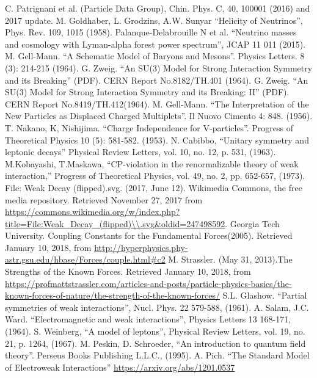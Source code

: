 \documentclass[print]{nuthesis}
\begin{document}
\begin{thebibliography}{300}
 C. Patrignani et al. (Particle Data Group), Chin. Phys. C, 40, 100001 (2016) and 2017 update.  
 M. Goldhaber, L. Grodzins, A.W. Sunyar ``Helicity of Neutrinos'', Phys. Rev. 109, 1015 (1958).
 Palanque-Delabrouille N et al. ``Neutrino masses and cosmology with Lyman-alpha forest power spectrum'', JCAP 11 011 (2015).
 M. Gell-Mann. ``A Schematic Model of Baryons and Mesons''. Physics Letters. 8 (3): 214-215 (1964).
 G. Zweig. ``An SU(3) Model for Strong Interaction Symmetry and its Breaking'' (PDF). CERN Report No.8182/TH.401 (1964).
 G. Zweig. ``An SU(3) Model for Strong Interaction Symmetry and its Breaking: II'' (PDF). CERN Report No.8419/TH.412(1964).
 M. Gell-Mann. ``The Interpretation of the New Particles as Displaced Charged Multiplets''. Il Nuovo Cimento 4: 848. (1956).
 T. Nakano, K, Nishijima. ``Charge Independence for V-particles''. Progress of Theoretical Physics 10 (5): 581-582. (1953).  
 N. Cabibbo, ``Unitary symmetry and leptonic decays'' Physical Review Letters, vol. 10, no. 12, p. 531, (1963).
 M.Kobayashi, T.Maskawa, ``CP-violation in the renormalizable theory of weak interaction,'' Progress of Theoretical Physics, vol. 49, no. 2, pp. 652-657, (1973).
 File: Weak Decay (flipped).svg. (2017, June 12). Wikimedia Commons, the free media repository. Retrieved November 27, 2017 from \url{https://commons.wikimedia.org/w/index.php?title=File:Weak\_Decay\_(flipped)\\.svg\&oldid=247498592}.
 Georgia Tech University. Coupling Constants for the Fundamental Forces(2005). Retrieved January 10, 2018, from \url{http://hyperphysics.phy-astr.gsu.edu/hbase/Forces/couple.html\#c2}
 M. Strassler. (May 31, 2013).The Strengths of the Known Forces. Retrieved January 10, 2018, from \url{https://profmattstrassler.com/articles-and-posts/particle-physics-basics/the-known-forces-of-nature/the-strength-of-the-known-forces/}
 S.L. Glashow. ``Partial symmetries of weak interactions'', Nucl. Phys. 22 579-588, (1961).
 A. Salam, J.C. Ward. ``Electromagnetic and weak interactions'', Physics Letters 13 168-171, (1964).
 S. Weinberg, ``A model of leptons'', Physical Review Letters, vol. 19, no. 21, p. 1264, (1967).
 M. Peskin, D. Schroeder, ``An introduction to quantum field theory''. Perseus Books Publishing L.L.C., (1995).  
 A. Pich. ``The Standard Model of Electroweak Interactions'' \url{https://arxiv.org/abs/1201.0537}

\end{thebibliography}
\end{document}
